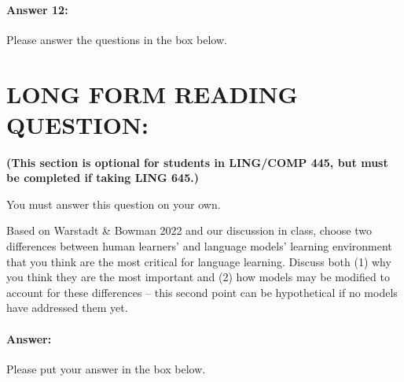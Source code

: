 \documentclass[10pt]{article}
\newenvironment{AnswerBox}{\begin{mdframed}[style=simple]}{\end{mdframed}}
\begin{document}
\paragraph{Answer 12:} Please answer the questions in the box below.

\begin{AnswerBox}%

    
\end{AnswerBox}%


\newpage
\section*{LONG FORM READING QUESTION:} 
\textbf{(This section is optional for students in LING/COMP 445, but must be completed if taking LING 645.)}

You must answer this question on your own.

Based on Warstadt \& Bowman 2022 and our discussion in class, choose two differences between human learners' and language models' learning environment that you think are the most critical for language learning. Discuss both (1) why you think they are the most important and (2) how models may be modified to account for these differences -- this second point can be hypothetical if no models have addressed them yet. 

\paragraph{Answer:} Please put your answer in the box below.

\begin{AnswerBox}%


\end{AnswerBox}%
\end{document}
